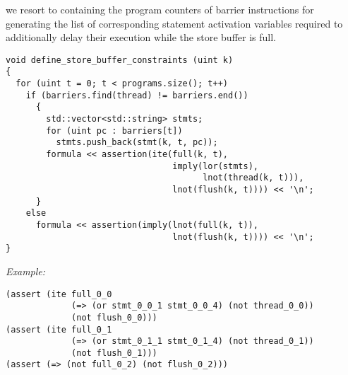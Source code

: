 we resort to  containing the program counters of barrier instructions for generating the list of corresponding statement activation variables required to additionally delay their execution while the store buffer is full.

\newpage

\begin{lstlisting}[style=c++]
void define_store_buffer_constraints (uint k)
{
  for (uint t = 0; t < programs.size(); t++)
    if (barriers.find(thread) != barriers.end())
      {
        std::vector<std::string> stmts;
        for (uint pc : barriers[t])
          stmts.push_back(stmt(k, t, pc));
        formula << assertion(ite(full(k, t),
                                 imply(lor(stmts),
                                       lnot(thread(k, t))),
                                 lnot(flush(k, t)))) << '\n';
      }
    else
      formula << assertion(imply(lnot(full(k, t)),
                                 lnot(flush(k, t)))) << '\n';
}
\end{lstlisting}

\noindent
\emph{Example:} 


\begin{lstlisting}[style=smtlib]
(assert (ite full_0_0
             (=> (or stmt_0_0_1 stmt_0_0_4) (not thread_0_0))
             (not flush_0_0)))
(assert (ite full_0_1
             (=> (or stmt_0_1_1 stmt_0_1_4) (not thread_0_1))
             (not flush_0_1)))
(assert (=> (not full_0_2) (not flush_0_2)))
\end{lstlisting}

